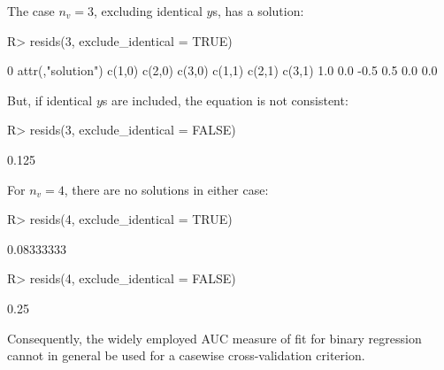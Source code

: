 \documentclass[
]{jss}
\begin{document}
The case \(n_v=3\), excluding identical \(y\)s, has a solution:

\begin{CodeChunk}
\begin{CodeInput}
R> resids(3, exclude_identical = TRUE)
\end{CodeInput}
\begin{CodeOutput}
[1] 0
attr(,"solution")
c(1,0) c(2,0) c(3,0) c(1,1) c(2,1) c(3,1) 
   1.0    0.0   -0.5    0.5    0.0    0.0 
\end{CodeOutput}
\end{CodeChunk}

But, if identical \(y\)s are included, the equation is not consistent:

\begin{CodeChunk}
\begin{CodeInput}
R> resids(3, exclude_identical = FALSE)
\end{CodeInput}
\begin{CodeOutput}
[1] 0.125
\end{CodeOutput}
\end{CodeChunk}

For \(n_v=4\), there are no solutions in either case:

\begin{CodeChunk}
\begin{CodeInput}
R> resids(4, exclude_identical = TRUE)
\end{CodeInput}
\begin{CodeOutput}
[1] 0.08333333
\end{CodeOutput}
\begin{CodeInput}
R> resids(4, exclude_identical = FALSE)
\end{CodeInput}
\begin{CodeOutput}
[1] 0.25
\end{CodeOutput}
\end{CodeChunk}

Consequently, the widely employed AUC measure of fit for binary
regression cannot in general be used for a casewise cross-validation
criterion.


\end{document}
